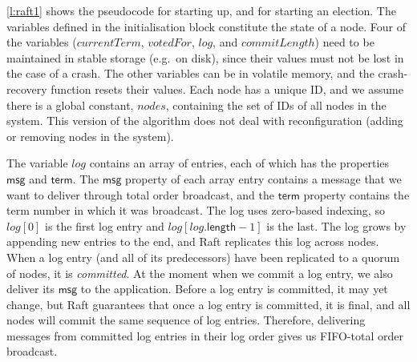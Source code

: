 


\autoref{l:raft1} shows the pseudocode for starting up, and for starting an election.
The variables defined in the initialisation block constitute the state of a node.
Four of the variables ($\mathit{currentTerm}$, $\mathit{votedFor}$, $\mathit{log}$, and $\mathit{commitLength}$) need to be maintained in stable storage (e.g.\ on disk), since their values must not be lost in the case of a crash.
The other variables can be in volatile memory, and the crash-recovery function resets their values.
Each node has a unique ID, and we assume there is a global constant, $\mathit{nodes}$, containing the set of IDs of all nodes in the system.
This version of the algorithm does not deal with reconfiguration (adding or removing nodes in the system).

The variable $\mathit{log}$ contains an array of entries, each of which has the properties $\mathsf{msg}$ and $\mathsf{term}$.
The $\mathsf{msg}$ property of each array entry contains a message that we want to deliver through total order broadcast, and the $\mathsf{term}$ property contains the term number in which it was broadcast.
The log uses zero-based indexing, so $\mathit{log}[0]$ is the first log entry and $\mathit{log}[\mathit{log}.\mathsf{length}-1]$ is the last.
The log grows by appending new entries to the end, and Raft replicates this log across nodes.
When a log entry (and all of its predecessors) have been replicated to a quorum of nodes, it is \emph{committed}.
At the moment when we commit a log entry, we also deliver its $\mathsf{msg}$ to the application.
Before a log entry is committed, it may yet change, but Raft guarantees that once a log entry is committed, it is final, and all nodes will commit the same sequence of log entries.
Therefore, delivering messages from committed log entries in their log order gives us FIFO-total order broadcast.

